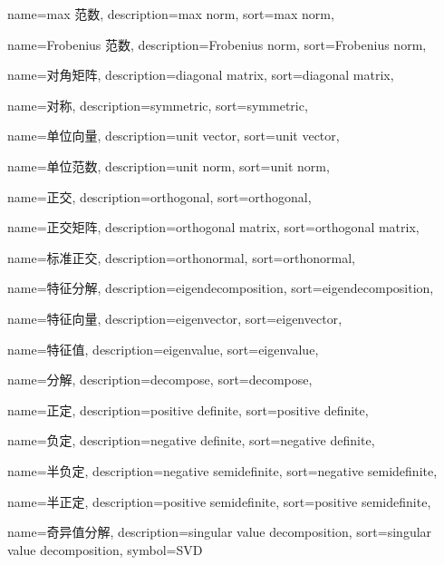 {
  name=max 范数,
  description={max norm},
  sort={max norm},
}

{
  name=Frobenius 范数,
  description={Frobenius norm},
  sort={Frobenius norm},
}

{
  name=对角矩阵,
  description={diagonal matrix},
  sort={diagonal matrix},
}

{
  name=对称,
  description={symmetric},
  sort={symmetric},
}

{
  name=单位向量,
  description={unit vector},
  sort={unit vector},
}

{
  name=单位范数,
  description={unit norm},
  sort={unit norm},
}

{
  name=正交,
  description={orthogonal},
  sort={orthogonal},
}

{
  name=正交矩阵,
  description={orthogonal matrix},
  sort={orthogonal matrix},
}

{
  name=标准正交,
  description={orthonormal},
  sort={orthonormal},
}

{
  name=特征分解,
  description={eigendecomposition},
  sort={eigendecomposition},
}

{
  name=特征向量,
  description={eigenvector},
  sort={eigenvector},
}

{
  name=特征值,
  description={eigenvalue},
  sort={eigenvalue},
}

{
  name=分解,
  description={decompose},
  sort={decompose},
}

{
  name=正定,
  description={positive definite},
  sort={positive definite},
}

{
  name=负定,
  description={negative definite},
  sort={negative definite},
}

{
  name=半负定,
  description={negative semidefinite},
  sort={negative semidefinite},
}

{
  name=半正定,
  description={positive semidefinite},
  sort={positive semidefinite},
}

{
  name=奇异值分解,
  description={singular value decomposition},
  sort={singular value decomposition},
  symbol={SVD}
}

